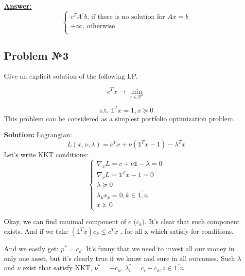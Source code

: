 \underline{\textbf{Answer:}}
\begin{equation*}
    \begin{cases}
    c^TA^{\dag}b \text{, if there is no solution for } Ax = b \\
    + \infty \text{, otherwise} \\
    \end{cases}
\end{equation*}


\subsection{Problem №3}
Give an explicit solution of the following LP.

\begin{equation*}
    c^T x  \xrightarrow{} \min\limits_{x \in \mathds{R}^n}
\end{equation*}

\begin{equation*}
   \text{s.t. } \mathds{1}^Tx = 1, x \succeq 0
\end{equation*}
This problem can be considered as a simplest portfolio optimization problem.

\underline{\textbf{Solution:}}
Lagrangian:
\begin{equation*}
    L(x, \nu, \lambda) = c^Tx + \nu(\mathds{1}^Tx - 1) - \lambda^Tx
\end{equation*}
Let's write KKT conditions:
\begin{equation*}
    \begin{cases}
    \nabla_x L = c + \nu \mathds{1} - \lambda = 0 \\
    \nabla_{\nu} L = \mathds{1}^Tx - 1 =0   \\
    \lambda \succeq 0 \\
    \lambda_k x_k = 0, k \in \overline{1, n} \\
    x \succeq 0 
    
    \end{cases}
\end{equation*}


Okay, we can find minimal component of c ($c_k)$. It's clear that such component exists. And if we take $(\mathds{1}^Tx)c_k \leq c^Tx$ , for all x which satisfy for conditions. 

And we easily get: $p^* = c_k$. It's funny that we need to invest all our money in only one asset, but it's clearly true if we know and sure in all outcomes. Such $\lambda$ and $\nu$ exist that satisfy KKT, $\nu^* = - c_k$, $\lambda_i^* = c_i - c_k, i \in \overline{1, n}$

